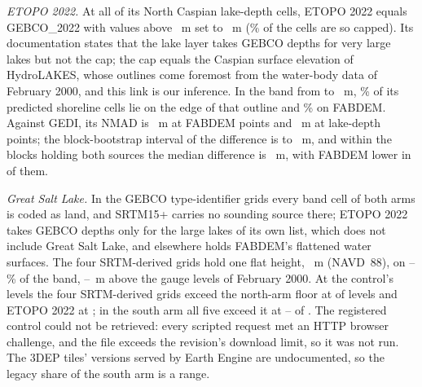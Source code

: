 \emph{ETOPO 2022.} At all  of its North Caspian lake-depth cells, ETOPO 2022 equals GEBCO\_2022 with values above ~m set to ~m (\% of the cells are so capped). Its documentation states that the lake layer takes GEBCO depths for very large lakes\citep{etopo2022_userguide,macferrin2025} but not the cap; the cap equals the Caspian surface elevation of HydroLAKES, whose outlines come foremost from the water-body data of February 2000\citep{hydrolakes_doc,messager2016}, and this link is our inference. In the band from  to ~m, \% of its predicted shoreline cells lie on the edge of that outline and \% on FABDEM. Against GEDI, its NMAD is ~m at FABDEM points and ~m at lake-depth points; the block-bootstrap interval of the difference is  to ~m, and within the  blocks holding both sources the median difference is ~m, with FABDEM lower in  of them.

\emph{Great Salt Lake.} In the GEBCO type-identifier grids every band cell of both arms is coded as land, and SRTM15+ carries no sounding source there\citep{gebco2026,tozer2019}; ETOPO 2022 takes GEBCO depths only for the large lakes of its own list, which does not include Great Salt Lake, and elsewhere holds FABDEM's flattened water surfaces\citep{macferrin2025,copdem_handbook_i5}. The four SRTM-derived grids hold one flat height, ~m (NAVD~88), on --\% of the band, --~m above the gauge levels of February 2000. At the control's levels the four SRTM-derived grids exceed the north-arm floor at  of  levels and ETOPO 2022 at ; in the south arm all five exceed it at -- of . The registered control could not be retrieved: every scripted request met an HTTP  browser challenge, and the file exceeds the revision's download limit, so it was not run. The 3DEP tiles' versions served by Earth Engine are undocumented, so the legacy share of the south arm is a range.


